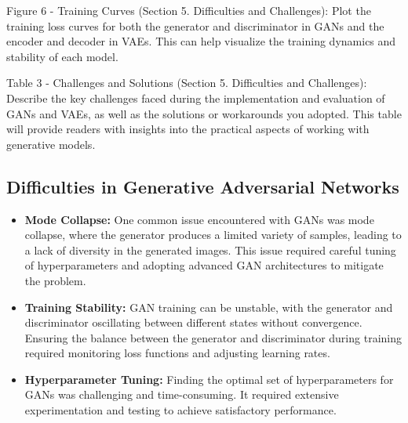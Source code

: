 \documentclass{article}
\begin{document}
Figure 6 - Training Curves (Section 5. Difficulties and Challenges): Plot the training loss curves for both the generator and discriminator in GANs and the encoder and decoder in VAEs. This can help visualize the training dynamics and stability of each model.

Table 3 - Challenges and Solutions (Section 5. Difficulties and Challenges): Describe the key challenges faced during the implementation and evaluation of GANs and VAEs, as well as the solutions or workarounds you adopted. This table will provide readers with insights into the practical aspects of working with generative models.

\subsection{Difficulties in Generative Adversarial Networks}
\begin{itemize}
    \item \textbf{Mode Collapse:} One common issue encountered with GANs was mode collapse, where the generator produces a limited variety of samples, leading to a lack of diversity in the generated images. This issue required careful tuning of hyperparameters and adopting advanced GAN architectures to mitigate the problem.
    \item \textbf{Training Stability:} GAN training can be unstable, with the generator and discriminator oscillating between different states without convergence. Ensuring the balance between the generator and discriminator during training required monitoring loss functions and adjusting learning rates.
    \item \textbf{Hyperparameter Tuning:} Finding the optimal set of hyperparameters for GANs was challenging and time-consuming. It required extensive experimentation and testing to achieve satisfactory performance.
\end{itemize}
\end{document}
